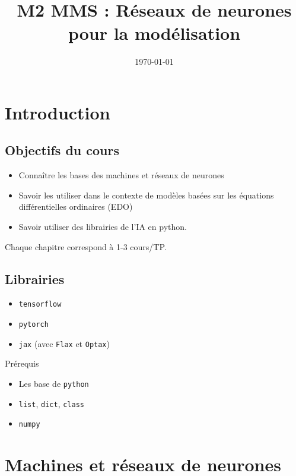 \documentclass[11pt,a4paper, french]{article}
\title{M2 MMS : Réseaux de neurones pour la modélisation}
\author{}
\date{\today}
\begin{document}

\maketitle
\tableofcontents
%
\section*{Introduction}\label{sec:}
%
\subsection*{Objectifs du cours}\label{subsec:}
%
\begin{itemize}
\item Connaître les bases des machines et réseaux de neurones
\item Savoir les utiliser dans le contexte de modèles basées sur les équations différentielles ordinaires (EDO)
\item Savoir utiliser des librairies de l'IA en python.
\end{itemize}
%
Chaque chapitre correspond à 1-3 cours/TP.
%
\subsection*{Librairies}\label{subsec:}
%
\begin{itemize}
\item \texttt{tensorflow}
\item \texttt{pytorch}
\item \texttt{jax} (avec \texttt{Flax} et \texttt{Optax})
\end{itemize}
%
Prérequis
\begin{itemize}
\item Les base de \texttt{python}
\item \texttt{list}, \texttt{dict}, \texttt{class}
\item \texttt{numpy}
\end{itemize}
%
\section{Machines et réseaux de neurones}\label{sec:}
%
\end{document}
